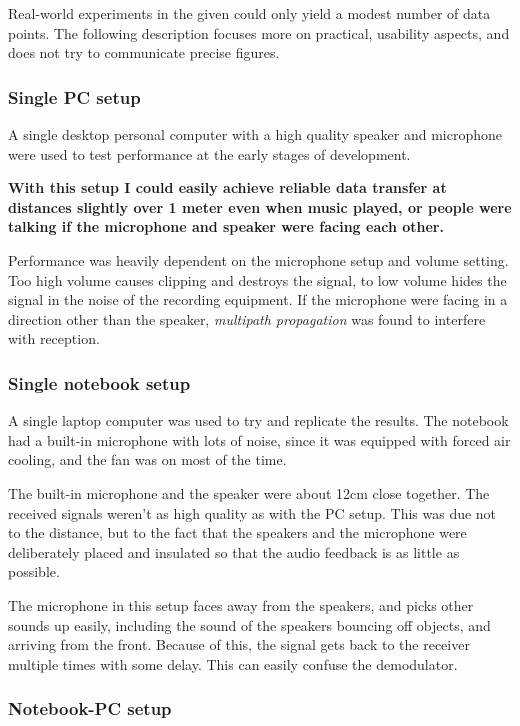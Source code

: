 \documentclass[a4paper]{article}
\begin{document}
Real-world experiments in the given could only yield a modest number
of data points. The following description focuses more on practical,
usability aspects, and does not try to communicate precise figures.

\subsubsection{Single PC setup}

A single desktop personal computer with a high quality speaker and 
microphone were used to test performance at the early stages of 
development.

\textbf{With this setup I could easily achieve reliable data transfer 
at distances slightly over 1 meter even when music played, or people 
were talking if the microphone and speaker were facing each other.}

Performance was heavily dependent on the microphone setup and volume 
setting. Too high volume causes clipping and destroys the signal, to 
low volume hides the signal in the noise of the recording equipment. If 
the microphone were facing in a direction other than the speaker, 
\emph{multipath propagation} was found to interfere with reception.

\subsubsection{Single notebook setup}

A single laptop computer was used to try and replicate the results. The 
notebook had a built-in microphone with lots of noise, since it was 
equipped with forced air cooling, and the fan was on most of the time.

The built-in microphone and the speaker were about 12cm close together. 
The received signals weren't as high quality as with the PC setup. This 
was due not to the distance, but to the fact that the speakers and the 
microphone were deliberately placed and insulated so that the audio 
feedback is as little as possible.

The microphone in this setup faces away from the speakers, and picks 
other sounds up easily, including the sound of the speakers bouncing
off objects, and arriving from the front. Because of this, the signal
gets back to the receiver multiple times with some delay.
This can easily confuse the demodulator.

\subsubsection{Notebook-PC setup}
\end{document}
